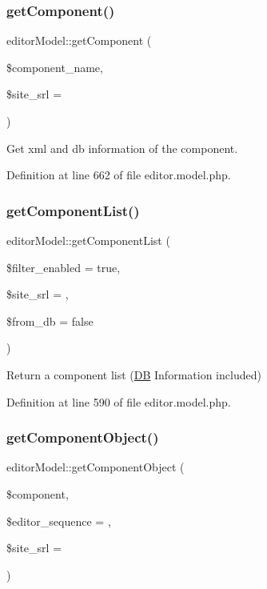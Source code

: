\subsubsection{\texorpdfstring{get\+Component()}{getComponent()}}
{\footnotesize\ttfamily editor\+Model\+::get\+Component (\begin{DoxyParamCaption}\item[{}]{\$component\+\_\+name,  }\item[{}]{\$site\+\_\+srl = {} }\end{DoxyParamCaption})}



Get xml and db information of the component. 



Definition at line 662 of file editor.\+model.\+php.

\hypertarget{classeditorModel_a24cf5d2f9bc9783dd2efd85fb0f89408}{}\label{classeditorModel_a24cf5d2f9bc9783dd2efd85fb0f89408} 
\subsubsection{\texorpdfstring{get\+Component\+List()}{getComponentList()}}
{\footnotesize\ttfamily editor\+Model\+::get\+Component\+List (\begin{DoxyParamCaption}\item[{}]{\$filter\+\_\+enabled = {\ttfamily true},  }\item[{}]{\$site\+\_\+srl = {},  }\item[{}]{\$from\+\_\+db = {\ttfamily false} }\end{DoxyParamCaption})}



Return a component list (\hyperlink{classDB}{DB} Information included) 



Definition at line 590 of file editor.\+model.\+php.

\hypertarget{classeditorModel_aef219fecfb7dcd9343cc9028930eaccd}{}\label{classeditorModel_aef219fecfb7dcd9343cc9028930eaccd} 
\subsubsection{\texorpdfstring{get\+Component\+Object()}{getComponentObject()}}
{\footnotesize\ttfamily editor\+Model\+::get\+Component\+Object (\begin{DoxyParamCaption}\item[{}]{\$component,  }\item[{}]{\$editor\+\_\+sequence = {},  }\item[{}]{\$site\+\_\+srl = {} }\end{DoxyParamCaption})}



